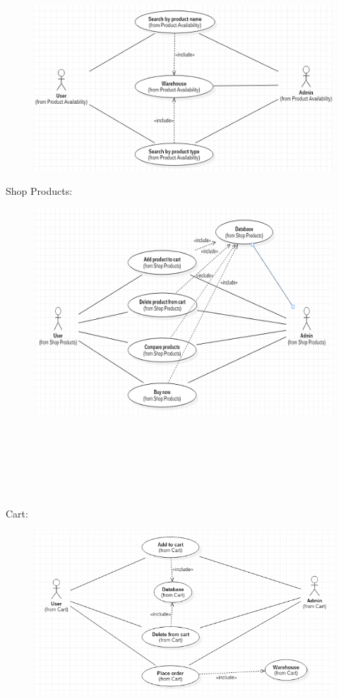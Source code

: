 \documentclass{tcc}
\begin{document}
\begin{figure}[H]
\centering
\includegraphics{images/productavailability.PNG}\\
\end{figure}
\begin{flushleft}
\Large{{\selectfont
Shop Products:
}}
\end{flushleft}
\begin{figure}[H]
\centering
\includegraphics{images/shopproducts.PNG}\\
\end{figure}
\ \\ \\ \\ \\ \\
\begin{flushleft}
\Large{{\selectfont
Cart:
}}
\end{flushleft}
\begin{figure}[H]
\centering
\includegraphics{images/cart.PNG}\\
\end{figure}
\end{document}
